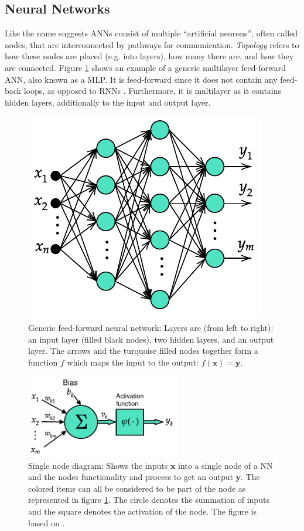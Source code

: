 \documentclass[../main.tex]{subfiles}
\begin{document}
\subsection{Neural Networks}
\label{sec:A-NeuralNetworks}
Like the name suggests \acp{ANN} consist of multiple ``artificial neurons'', often called nodes, that are interconnected by pathways for communication.
\textit{Topology} refers to how these nodes are placed (e.g. into layers), how many there are, and how they are connected.
Figure \ref{fig:generic-ann} shows an example of a generic multilayer feed-forward \ac{ANN}, also known as a \ac{MLP}.
It is feed-forward since it does not contain any feed-back loops, as opposed to \acp{RNN} \cite{Goodfellow2016, Haykin2009}. 
Furthermore, it is multilayer as it contains hidden layers, additionally to the input and output layer.
\begin{figure}[ht!]
    \centering
    \includegraphics{img/generic-ann-diagram}
    \caption{Generic feed-forward neural network: Layers are (from left to right): an input layer (filled black nodes), two hidden layers, and an output layer. The arrows and the turquoise filled nodes together form a function $f$ which maps the input to the output: $f(\mathbf{x})=\mathbf{y} $.}
    \label{fig:generic-ann}
\end{figure}
\begin{figure}[ht!]
    \centering
    \includegraphics[width=0.6\textwidth]{img/node-diagram}
    \caption{Single node diagram: Shows the inputs $\mathbf{x}$ into a single node of a \ac{NN} and the nodes functionality and process to get an output $\mathbf{y}$. The colored items can all be considered to be part of the node as represented in figure \ref{fig:generic-ann}. The circle denotes the summation of inputs and the square denotes the activation of the node. The figure is based on \cite[Fig. 5]{Haykin2009}.}
    \label{fig:node-diagram}
\end{figure}
\end{document}

